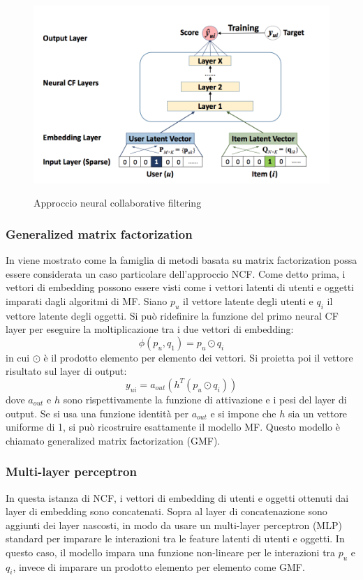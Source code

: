 \begin{figure}
  \centering
  \includegraphics[width=\linewidth]{immagini/ncf.png}
  \caption{Approccio neural collaborative filtering}
  \cite{NCF}
  \label{fig:ncf}
\end{figure}

\subsubsection{Generalized matrix factorization} \label{sssec:gmf}
In \cite{NCF} viene mostrato come la famiglia di metodi basata su matrix factorization possa essere considerata un caso particolare dell'approccio NCF. Come detto prima, i vettori di embedding possono essere visti come i vettori latenti di utenti e oggetti imparati dagli algoritmi di MF. Siano $p_u$ il vettore latente degli utenti e $q_i$ il vettore latente degli oggetti. Si può ridefinire la funzione del primo neural CF layer per eseguire la moltiplicazione tra i due vettori di embedding:
$$
\phi(p_u, q_1) = p_u \odot q_i
$$
in cui $\odot$ è il prodotto elemento per elemento dei vettori. Si proietta poi il vettore risultato sul layer di output:
$$
y_{ui} = a_{out}(h^T(p_u \odot q_i))
$$
dove $a_{out}$ e $h$ sono rispettivamente la funzione di attivazione e  i pesi del layer di output.  Se si usa una funzione identità per $a_{out}$ e si impone che $h$ sia un vettore uniforme di 1, si può ricostruire esattamente il modello MF. Questo modello è chiamato generalized matrix factorization (GMF).

\subsubsection{Multi-layer perceptron} \label{sssec:mlp}
In questa istanza di NCF, i vettori di embedding di utenti e oggetti ottenuti dai layer di embedding sono concatenati. Sopra al layer di concatenazione sono aggiunti dei layer nascosti, in modo da usare un multi-layer perceptron (MLP) standard per imparare le interazioni tra le feature latenti di utenti e oggetti. In questo caso, il modello impara una funzione non-lineare per le interazioni tra $p_u$ e $q_i$, invece di imparare un prodotto elemento per elemento come GMF. 

